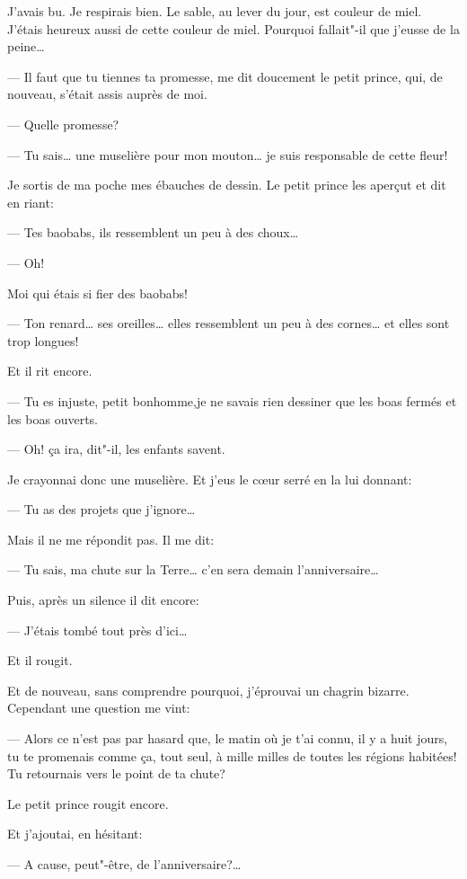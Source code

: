 \medskip

J'avais bu. Je respirais bien. Le sable, au lever du jour, est couleur de miel.
J'étais heureux aussi de cette couleur de miel. Pourquoi fallait"-il que j'eusse
de la peine\ldots{}

--- Il faut que tu tiennes ta promesse, me dit doucement le petit prince, qui, de
nouveau, s'était assis auprès de moi.

--- Quelle promesse?

--- Tu sais\ldots{} une muselière pour mon mouton\ldots{} je suis responsable de
cette fleur!

Je sortis de ma poche mes ébauches de dessin. Le petit prince les aperçut et dit
en riant:

--- Tes baobabs, ils ressemblent un peu à des choux\ldots{}

--- Oh!

Moi qui étais si fier des baobabs!

--- Ton renard\ldots{} ses oreilles\ldots{} elles ressemblent un peu à des cornes\ldots{}
et elles sont trop longues!

Et il rit encore.

--- Tu es injuste, petit bonhomme,je ne savais rien dessiner que les boas fermés
et les boas ouverts.

--- Oh! ça ira, dit"-il, les enfants savent.

Je crayonnai donc une muselière. Et j'eus le cœur serré en la lui donnant:

--- Tu as des projets que j'ignore\ldots{}

Mais il ne me répondit pas. Il me dit:

--- Tu sais, ma chute sur la Terre\ldots{} c'en sera demain l'anniversaire\ldots{}

Puis, après un silence il dit encore:

--- J'étais tombé tout près d'ici\ldots{}

Et il rougit.

Et de nouveau, sans comprendre pourquoi, j'éprouvai un chagrin bizarre. Cependant
une question me vint:

--- Alors ce n'est pas par hasard que, le matin où je t'ai connu, il y a huit jours,
tu te promenais comme ça, tout seul, à mille milles de toutes les régions habitées!
Tu retournais vers le point de ta chute?

Le petit prince rougit encore.

Et j'ajoutai, en hésitant:

--- A cause, peut"-être, de l'anniversaire?\ldots{}

